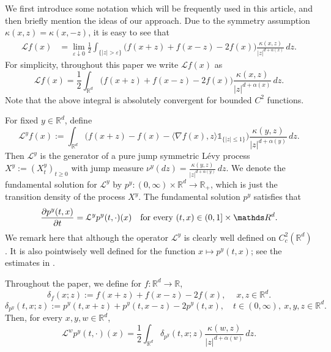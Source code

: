 \documentclass[a4paper,11pt]{amsart}
\renewcommand{\le}{\leqslant}
\renewcommand{\ge}{\geqslant}
\newcommand{\R}{\mathds R}
\newcommand{\I}{\mathds 1}
\newcommand{\K}{\kappa}
\newcommand{\e}{ \varepsilon}
\def\LL{{\mathcal L}}
\theoremstyle{definition}
\begin{document}
We first introduce some notation which will be
frequently used in this article, and then briefly mention the ideas of our approach.
Due to the symmetry assumption  $\K(x,z)=\K(x,-z)$, it is easy to see that
\begin{equation}\label{e2-1}
\begin{split}
\LL f(x)&=\lim_{\e \downarrow 0}\frac{1}{2}\int_{\{|z|>\e\}}
\big(f(x+z)+f(x-z)-2f(x)\big)\frac{\K(x,z)}{|z|^{d+\alpha(x)}}\,dz.
\end{split}
\end{equation}
For simplicity, throughout this paper we write $\LL f(x)$ as
\begin{equation*}
\LL f(x)=\frac{1}{2}\int_{\R^d}
\big(f(x+z)+f(x-z)-2f(x)\big)\frac{\K(x,z)}{|z|^{d+\alpha(x)}}\,dz.
\end{equation*}
Note that the above integral is absolutely convergent for bounded $C^2$ functions.

For fixed $y \in \R^d$, define
\begin{equation}\label{e2-2}
\LL^y f(x):=\int_{\R^d}\big(f(x+z)-f(x)-\langle\nabla f(x), z \rangle\I_{\{|z|\le 1\}}\big)\frac{\K(y,z)}{|z|^{d+\alpha(y)}}\,dz.
\end{equation}
Then $ \LL^y$ is the generator of a pure jump symmetric  L\'{e}vy process
$X^y:=(X_t^y)_{t\ge 0}$ with  jump measure
$\nu^y(dz)=\frac{\K(y,z)}{|z|^{d+\alpha(y)}}\,dz$.
We denote the
fundamental solution for $ \LL^y$ by $p^y:(0,\infty)\times \R^d
\rightarrow \R_+$, which is just the transition density of the
process $X^y$. The fundamental solution $p^y$ satisfies
that
\begin{equation*}
\frac{\partial p^y(t,x)}{\partial t}= \LL^yp^y(t,\cdot)(x)
\quad \hbox{for every } (t,x)\in (0,1]\times \R^d.
\end{equation*}
We remark here that although the operator $ \LL^y$
is clearly well defined on $C_c^2(\R^d)$.
It is also pointwisely well defined for the function
$x\mapsto p^y(t, x)$;  see  the
estimates in \cite[Theorem 2.4]{CZ}.

Throughout the paper,  we define for $ f:\R^d\rightarrow \R$,
\begin{equation*}
\delta_f(x;z):=f(x+z)+f(x-z)-2f(x), \quad \ x,z\in \R^d.
\end{equation*}
\begin{equation*}
\delta_{p^y}(t,x;z):=p^y(t,x+z)+p^y(t,x-z)-2p^y(t,x),\quad t\in
(0,\infty),\ x,y,z\in \R^d.
\end{equation*}
Then, for every $x,y,w\in \R^d$,
\begin{equation}\label{e2-3}
 \LL^w p^y(t,\cdot)(x)=\frac{1}{2}\int_{\R^d}\delta_{p^y}(t,x;z)\frac{\K(w,z)}{|z|^{d+\alpha(w)}}\,dz.
\end{equation}
\end{document}
